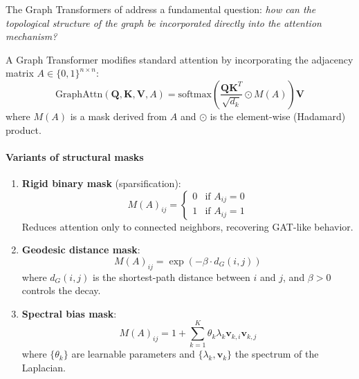 The Graph \glspl{Transformer} of \citet{dwivedi2021generalization} address a fundamental question: \textit{how can the topological structure of the graph be incorporated directly into the attention mechanism?}

\begin{definition}\label{def:graph_transformer_bias}
A Graph \gls{Transformer} modifies standard attention by incorporating the adjacency matrix $A \in \{0,1\}^{n \times n}$:
\begin{equation}
    \text{GraphAttn}(\mathbf{Q}, \mathbf{K}, \mathbf{V}, A) = \text{softmax}\left(\frac{\mathbf{Q}\mathbf{K}^T}{\sqrt{d_k}} \odot M(A)\right)\mathbf{V}
    \label{eq:graph_transformer_masked_attention}
\end{equation}
where $M(A)$ is a mask derived from $A$ and $\odot$ is the element-wise (Hadamard) product.
\end{definition}

\paragraph{Variants of structural masks}

\begin{enumerate}
    \item \textbf{Rigid binary mask} (sparsification):
    \begin{equation}
        M(A)_{ij} = \begin{cases}
            0 & \text{if } A_{ij} = 0 \\
            1 & \text{if } A_{ij} = 1
        \end{cases}
        \label{eq:binary_mask}
    \end{equation}
    Reduces attention only to connected neighbors, recovering \gls{GAT}-like behavior.

    \item \textbf{Geodesic distance mask}:
    \begin{equation}
        M(A)_{ij} = \exp\left(-\beta \cdot d_G(i,j)\right)
        \label{eq:geodesic_mask}
    \end{equation}
    where $d_G(i,j)$ is the shortest-path distance between $i$ and $j$, and $\beta > 0$ controls the decay.

    \item \textbf{Spectral bias mask}:
    \begin{equation}
        M(A)_{ij} = 1 + \sum_{k=1}^{K} \theta_k \lambda_k \mathbf{v}_{k,i} \mathbf{v}_{k,j}
        \label{eq:spectral_bias_mask}
    \end{equation}
    where $\{\theta_k\}$ are learnable parameters and $\{\lambda_k, \mathbf{v}_k\}$ the spectrum of the Laplacian.
\end{enumerate}

